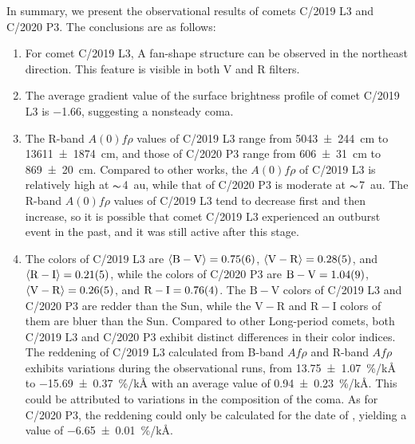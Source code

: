 In summary, we present the observational results of comets C/2019 L3 and C/2020 P3. The conclusions are as follows: 
\begin{enumerate}
    \item For comet C/2019 L3, A fan-shape structure can be observed in the northeast direction. This feature is visible in both V and R filters. 
    \item The average gradient value  of the surface brightness profile of comet C/2019 L3 is \num{-1.66}, suggesting a nonsteady coma. 
    \item The R-band $A(0)f\rho$ values of C/2019 L3 range from {\qty{5043 +- 244}{\cm}} to {\qty{13611 +- 1874}{\cm}}, and those of C/2020 P3 range from {\qty{606 +- 31}{\cm}} to {\qty{869 +- 20}{\cm}}. Compared to other works, the $A(0)f\rho$ of C/2019 L3 is relatively high at $\thicksim${\qty{4}{\astronomicalunit}}, while that of C/2020 P3 is moderate at $\thicksim${\qty{7}{\astronomicalunit}}. The R-band $A(0)f\rho$ values of C/2019 L3 tend to decrease first and then increase, so it is possible that comet C/2019 L3 experienced an outburst event in the past, and it was still active after this stage. 
    \item The colors of C/2019 L3 are  
        $\langle \mathrm{B-V} \rangle = \num{0.75 +- 0.06}$, 
        $\langle \mathrm{V-R} \rangle = \num{0.28 +- 0.05}$, and 
        $\langle \mathrm{R-I} \rangle = \num{0.21 +- 0.05}$,  
        while the colors of C/2020 P3 are 
        $\mathrm{B-V} = \num{1.04 +- 0.09}$, 
        $\langle \mathrm{V-R} \rangle = \num{0.26 +- 0.05}$, and 
        $\mathrm{R-I} = \num{0.76 +- 0.04}$. 
        The $\mathrm{B-V}$ colors of C/2019 L3 and C/2020 P3 are redder than the Sun, while the $\mathrm{V-R}$ and $\mathrm{R-I}$ colors of them are bluer than the Sun. Compared to other Long-period comets, both C/2019 L3 and C/2020 P3 exhibit distinct differences in their color indices. The reddening of C/2019 L3 calculated from B-band $Af\rho$ and R-band $Af\rho$ exhibits variations during the observational runs, from {\qty{13.75 +- 1.07}{\percent/\kilo\angstrom}} to {\qty{-15.69 +- 0.37}{\percent/\kilo\angstrom}} with an average value of {\qty{0.94 +- 0.23}{\percent/\kilo\angstrom}}. This could be attributed to  variations in the composition of the coma. As for C/2020 P3, the reddening could only be calculated for the date of , yielding a value of {\qty{-6.65 +- 0.01}{\percent/\kilo\angstrom}}. 
\end{enumerate}
